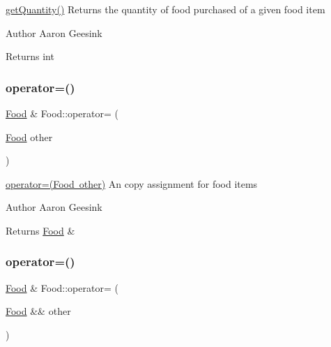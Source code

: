 \mbox{\hyperlink{class_food_ac05d435166d85ee4e7022e98f91f76d7}{get\+Quantity()}} Returns the quantity of food purchased of a given food item 

\begin{DoxyAuthor}{Author}
Aaron Geesink 
\end{DoxyAuthor}
\begin{DoxyReturn}{Returns}
int 
\end{DoxyReturn}
\mbox{\label{class_food_abe2267ba02f1b812c71028f427d92d81}} 
\subsubsection{\texorpdfstring{operator=()}{operator=()}\hspace{0.1cm}{\footnotesize\ttfamily [1/2]}}
{\footnotesize\ttfamily \mbox{\hyperlink{class_food}{Food}} \& Food\+::operator= (\begin{DoxyParamCaption}\item[{\mbox{\hyperlink{class_food}{Food}}}]{other }\end{DoxyParamCaption})}



\mbox{\hyperlink{class_food_abe2267ba02f1b812c71028f427d92d81}{operator=(\+Food other)}} An copy assignment for food items 

\begin{DoxyAuthor}{Author}
Aaron Geesink 
\end{DoxyAuthor}
\begin{DoxyReturn}{Returns}
\mbox{\hyperlink{class_food}{Food}} \& 
\end{DoxyReturn}
\mbox{\label{class_food_a0ba9d6f416f396bc8e4a1c2ad519d3eb}} 
\subsubsection{\texorpdfstring{operator=()}{operator=()}\hspace{0.1cm}{\footnotesize\ttfamily [2/2]}}
{\footnotesize\ttfamily \mbox{\hyperlink{class_food}{Food}} \& Food\+::operator= (\begin{DoxyParamCaption}\item[{\mbox{\hyperlink{class_food}{Food}} \&\&}]{other }\end{DoxyParamCaption})}



